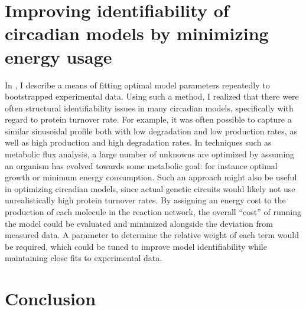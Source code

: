 \section{Improving identifiability of circadian models by minimizing energy usage}

In , I describe a means of fitting optimal model parameters repeatedly to bootstrapped experimental data.
Using such a method, I realized that there were often structural identifiability issues in many circadian models, specifically with regard to protein turnover rate.
For example, it was often possible to capture a similar sinusoidal profile both with low degradation and low production rates, as well as high production and high degradation rates.
In techniques such as metabolic flux analysis, a large number of unknowns are optimized by assuming an organism has evolved towards some metabolic goal: for instance optimal growth or minimum energy consumption.
Such an approach might also be useful in optimizing circadian models, since actual genetic circuits would likely not use unrealistically high protein turnover rates.
By assigning an energy cost to the production of each molecule in the reaction network, the overall ``cost'' of running the model could be evaluated and minimized alongside the deviation from measured data.
A parameter to determine the relative weight of each term would be required, which could be tuned to improve model identifiability while maintaining close fits to experimental data.

\section{Conclusion}




